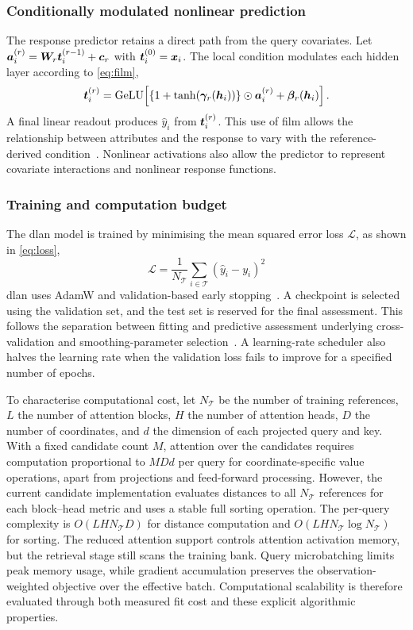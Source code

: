 \documentclass[]{interact}
\newcommand{\train}{\mathcal{T}}
\newcommand{\gelu}{\operatorname{GeLU}}
\newcommand{\DLAN}{\gls{dlan}\xspace}
\begin{document}
\subsubsection{Conditionally modulated nonlinear prediction}

The response predictor retains a direct path from the query covariates.
Let $\bm{a}^{(r)}_i=\bm{W}_r\bm{t}^{(r-1)}_i+\bm{c}_r$ with $\bm{t}^{(0)}_i=\bm{x}_i$.
The local condition modulates each hidden layer according to \autoref{eq:film},
\begin{equation}
 \vt^{(r)}_i=\gelu\!\left[
 \{1+\tanh(\bm{\gamma}_r(\vh_i))\}\odot\va^{(r)}_i
       +\bm{\beta}_r(\vh_i)\right].\label{eq:film}
\end{equation}
A final linear readout produces $\hat y_i$ from $\bm{t}^{(r)}_i$.
This use of \gls{film} allows the relationship between attributes and the response to vary with the reference-derived condition~\citep{PerezStrub-2018}.
Nonlinear activations also allow the predictor to represent covariate interactions and nonlinear response functions.

\subsubsection{Training and computation budget}

The \DLAN model is trained by minimising the mean squared error loss $\mathcal{L}$, as shown in \autoref{eq:loss},
\begin{equation} \label{eq:loss}
  \mathcal{L} = \frac{1}{N_{\train}}\sum_{i\in\train}(\hat y_i-y_i)^2
\end{equation}
\DLAN uses AdamW and validation-based early stopping~\citep{LoshchilovHutter-2019}.
A checkpoint is selected using the validation set, and the test set is reserved for the final assessment.
This follows the separation between fitting and predictive assessment underlying cross-validation and smoothing-parameter selection~\citep{Stone-1974,HurvichSimonoff-1998}.
A learning-rate scheduler also halves the learning rate when the validation loss fails to improve for a specified number of epochs.

To characterise computational cost, let $N_{\train}$ be the number of training references, $L$ the number of attention blocks, $H$ the number of attention heads, $D$ the number of coordinates, and $d$ the dimension of each projected query and key.
With a fixed candidate count $M$, attention over the candidates requires computation proportional to $MDd$ per query for coordinate-specific value operations,
apart from projections and feed-forward processing.
However, the current candidate implementation evaluates distances to all $N_{\train}$ references for each block--head metric and uses a stable full sorting operation.
The per-query complexity is $O(LHN_{\train}D)$ for distance computation and $O(LHN_{\train}\log N_{\train})$ for sorting.
The reduced attention support controls attention activation memory, but the retrieval stage still scans the training bank.
Query microbatching limits peak memory usage, while gradient accumulation preserves the observation-weighted objective over the effective batch.
Computational scalability is therefore evaluated through both measured fit cost and these explicit algorithmic properties.
\end{document}
